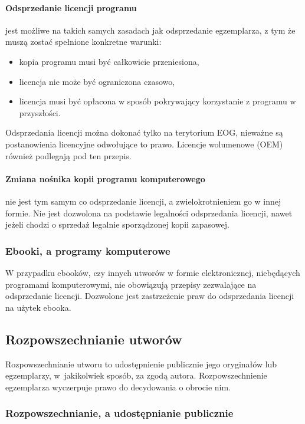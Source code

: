 \documentclass{article}
\begin{document}
\paragraph{Odsprzedanie licencji programu}

jest możliwe na takich samych zasadach jak odsprzedanie egzemplarza, z tym że muszą zostać spełnione konkretne warunki:
\begin{itemize}
  \item kopia programu musi być całkowicie przeniesiona,
  \item licencja nie może być ograniczona czasowo,
  \item licencja musi być opłacona w sposób pokrywający korzystanie z programu w przyszłości.
\end{itemize}
Odsprzedania licencji można dokonać tylko na terytorium EOG, nieważne są postanowienia licencyjne odwołujące to prawo. Licencje wolumenowe (OEM) również podlegają pod ten przepis.

\paragraph{Zmiana nośnika kopii programu komputerowego}

nie jest tym samym co odsprzedanie licencji, a zwielokrotnieniem go w innej formie. Nie jest dozwolona na podstawie legalności odsprzedania licencji, nawet jeżeli chodzi o sprzedaż legalnie sporządzonej kopii zapasowej.

\subsubsection{Ebooki, a programy komputerowe}

W przypadku ebooków, czy innych utworów w formie elektronicznej, niebędących programami komputerowymi, nie obowiązują przepisy zezwalające na odsprzedanie licencji. Dozwolone jest zastrzeżenie praw do odsprzedania licencji na użytek ebooka.

\subsection{Rozpowszechnianie utworów}

Rozpowszechnianie utworu to udostępnienie publicznie jego oryginałów lub egzemplarzy, w~jakikolwiek sposób, za zgodą autora. Rozpowszechnienie egzemplarza wyczerpuje prawo do decydowania o obrocie nim.

\subsubsection{Rozpowszechnianie, a udostępnianie publicznie}
\end{document}
